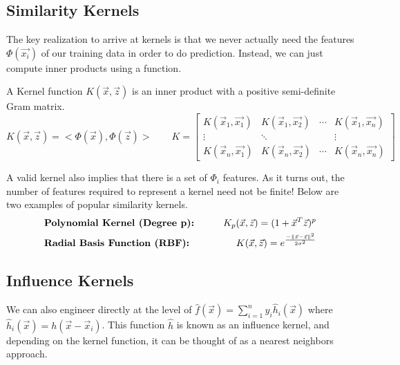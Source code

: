 \subsection{Similarity Kernels}
The key realization to arrive at kernels is that we never actually need the features $\Phi(\vec{x_i})$ of our training data in order to do prediction. Instead, we can just compute inner products using a function.
\begin{definition}
  A Kernel function $K(\vec{x}, \vec{z})$ is an inner product with a positive semi-definite Gram matrix.
  \[
    K(\vec{x}, \vec{z}) = <\Phi(\vec{x}), \Phi(\vec{z})> \qquad K = \begin{bmatrix}
      K(\vec{x}_1, \vec{x_1}) &  K(\vec{x}_1, \vec{x_2}) &  \cdots & K(\vec{x}_1, \vec{x_n})\\
      \vdots & \ddots & & \vdots\\
      K(\vec{x}_n, \vec{x_1}) &  K(\vec{x}_n, \vec{x_2}) &  \cdots & K(\vec{x}_n, \vec{x_n})
    \end{bmatrix}
  \]

\end{definition}
A valid kernel also implies that there is a set of $\Phi_i$ features. As it turns out, the number of features required to represent a kernel need not be finite! Below are two examples of popular similarity kernels.
\begin{align*}
  &\textbf{Polynomial Kernel (Degree p):} &\qquad K_p(\vec{x},\vec{z}) = (1+\vec{x}^T\vec{z})^p\\
  &\textbf{Radial Basis Function (RBF):} &\qquad K(\vec{x}, \vec{z}) = e^{\frac{-\|\vec{x}-\vec{z}\|^2}{2\sigma^2}}
\end{align*}
\subsection{Influence Kernels}
We can also engineer directly at the level of $\hat{f}(\vec{x})=\sum_{i=1}^ny_i\hat{h}_i(\vec{x})$ where $\hat{h}_i(\vec{x})=h(\vec{x}-\vec{x}_i)$.
This function $\hat{h}$ is known as an influence kernel, and depending on the kernel function, it can be thought of as a nearest neighbors approach.
